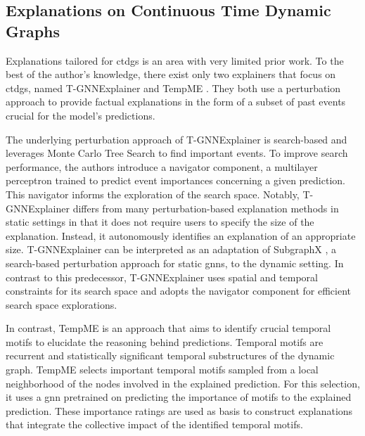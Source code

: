 \subsection{Explanations on Continuous Time Dynamic Graphs}
\label{s_relatedWork_CTDG}

Explanations tailored for \glspl{ctdg} is an area with very limited prior work. To the best of the author's knowledge, there exist only two explainers that focus on \glspl{ctdg}, named T-GNNExplainer \cite{xia_explaining_2023} and TempME \cite{chen_tempme_2023}. They both use a perturbation approach to provide factual explanations in the form of a subset of past events crucial for the model's predictions.

The underlying perturbation approach of T-GNNExplainer \cite{xia_explaining_2023} is search-based and leverages Monte Carlo Tree Search to find important events. To improve search performance, the authors introduce a navigator component, a multilayer perceptron trained to predict event importances concerning a given prediction. This navigator informs the exploration of the search space. Notably, T-GNNExplainer differs from many perturbation-based explanation methods in static settings in that it does not require users to specify the size of the explanation. Instead, it autonomously identifies an explanation of an appropriate size. T-GNNExplainer can be interpreted as an adaptation of SubgraphX \cite{yuan_explainability_2021}, a search-based perturbation approach for static \glspl{gnn}, to the dynamic setting. In contrast to this predecessor, T-GNNExplainer uses spatial and temporal constraints for its search space and adopts the navigator component for efficient search space explorations.

In contrast, TempME \cite{chen_tempme_2023} is an approach that aims to identify crucial temporal motifs to elucidate the reasoning behind predictions. Temporal motifs are recurrent and statistically significant temporal substructures of the dynamic graph. TempME selects important temporal motifs sampled from a local neighborhood of the nodes involved in the explained prediction. For this selection, it uses a \gls{gnn} pretrained on predicting the importance of motifs to the explained prediction. These importance ratings are used as basis to construct explanations that integrate the collective impact of the identified temporal motifs.



